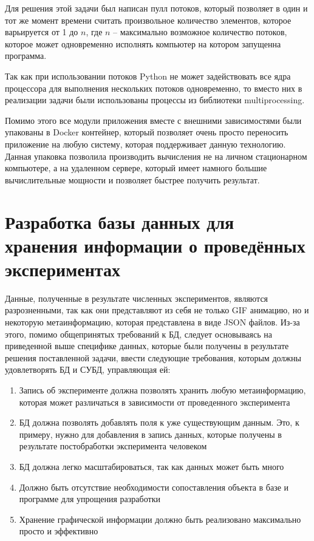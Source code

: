 \documentclass[14pt]{extreport}
\begin{document}
Для решения этой задачи был написан пулл потоков, который позволяет в один и тот же момент времени считать произвольное количество элементов, которое варьируется от 1 до $n$, где $n$ -- максимально возможное количество потоков, которое может одновременно исполнять компьютер на котором запущенна программа.

Так как при использовании потоков Python не может задействовать все ядра процессора для выполнения нескольких потоков одновременно, то вместо них в реализации задачи были использованы процессы из библиотеки multiprocessing.

Помимо этого все модули приложения вместе с внешними зависимостями были упакованы в Docker контейнер, который позволяет очень просто переносить приложение на любую систему, которая поддерживает данную технологию. Данная упаковка позволила производить вычисления не на личном стационарном компьютере, а на удаленном сервере, который имеет намного большие вычислительные мощности и позволяет быстрее получить результат.

\chapter{Разработка базы данных для хранения информации о проведённых экспериментах}

Данные, полученные в результате численных экспериментов, являются разрозненными, так как они представляют из себя не только GIF анимацию, но и некоторую метаинформацию, которая представлена в виде JSON файлов. Из-за этого, помимо общепринятых требований к БД, следует основываясь на приведенной выше специфике данных, которые были получены в результате решения поставленной задачи, ввести следующие требования, которым должны удовлетворять БД и СУБД, управляющая ей:

\begin{enumerate}

\item Запись об эксперименте должна позволять хранить любую метаинформацию, которая может различаться в зависимости от проведенного эксперимента

\item БД должна позволять добавлять поля к уже существующим данным. Это, к примеру, нужно для добавления в запись данных, которые получены в результате постобработки эксперимента человеком

\item БД должна легко масштабироваться, так как данных может быть много

\item Должно быть отсутствие необходимости сопоставления объекта в базе и программе для упрощения разработки

\item Хранение графической информации должно быть реализовано максимально просто и эффективно

\end{enumerate}
\end{document}
